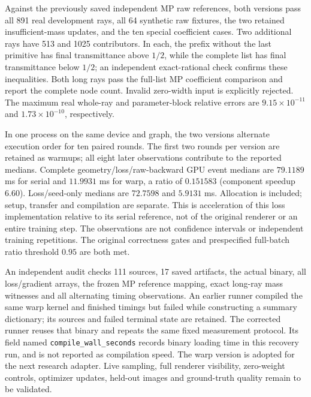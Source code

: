 \documentclass[11pt,a4paper]{article}
\begin{document}
Against the previously saved independent MP raw references, both versions
pass all 891 real development rays, all 64 synthetic raw fixtures, the
two retained insufficient-mass updates, and the ten special coefficient
cases. Two additional rays have 513 and 1025 contributors. In each,
the prefix without the last primitive has final transmittance above
$1/2$, while the complete list has final transmittance below $1/2$;
an independent exact-rational check confirms these inequalities.
Both long rays pass the full-list MP coefficient comparison and report
the complete node count. Invalid zero-width input is explicitly rejected.
The maximum real whole-ray and parameter-block relative errors are
$9.15\times10^{-11}$ and $1.73\times10^{-10}$, respectively.

In one process on the same device and graph, the two versions alternate
execution order for ten paired rounds. The first two rounds per version
are retained as warmups; all eight later observations contribute to the
reported medians. Complete geometry/loss/raw-backward GPU event medians
are $79.1189$ ms for serial and $11.9931$ ms for warp, a ratio of
$0.151583$ (component speedup $6.60$). Loss/seed-only medians are
$72.7598$ and $5.9131$ ms. Allocation is included; setup, transfer and
compilation are separate. This is acceleration of this loss implementation
relative to its serial reference, not of the original renderer or an
entire training step. The observations are not confidence intervals or
independent training repetitions. The original correctness gates and
prespecified full-batch ratio threshold $0.95$ are both met.

An independent audit checks 111 sources, 17 saved artifacts, the actual
binary, all loss/gradient arrays, the frozen MP reference mapping, exact
long-ray mass witnesses and all alternating timing observations. An
earlier runner compiled the same warp kernel and finished timings but
failed while constructing a summary dictionary; its sources and failed
terminal state are retained. The corrected runner reuses that binary
and repeats the same fixed measurement protocol. Its field named
\texttt{compile\_wall\_seconds} records binary loading time in this
recovery run, and is not reported as compilation speed.
The warp version is adopted for the next research adapter. Live sampling,
full renderer visibility, zero-weight controls, optimizer updates,
held-out images and ground-truth quality remain to be validated.
\end{document}

